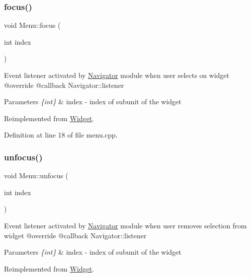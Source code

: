 \subsubsection{\texorpdfstring{focus()}{focus()}}
{\footnotesize\ttfamily void Menu\+::focus (\begin{DoxyParamCaption}\item[{int}]{index }\end{DoxyParamCaption})\hspace{0.3cm}{\ttfamily [virtual]}}

Event listener activated by \mbox{\hyperlink{class_navigator}{Navigator}} module when user selects on widget @override @callback Navigator\+::listener 
\begin{DoxyParams}{Parameters}
{\em \{int\}} & index -\/ index of subunit of the widget \\
\hline
\end{DoxyParams}


Reimplemented from \mbox{\hyperlink{class_widget_ac395fbcfd90f5a33a4bb2ca1d83631ca}{Widget}}.



Definition at line 18 of file menu.\+cpp.

\mbox{\label{class_menu_acc8b2492f87ebc9219eaad0fe0ecaa5c}} 
\subsubsection{\texorpdfstring{unfocus()}{unfocus()}}
{\footnotesize\ttfamily void Menu\+::unfocus (\begin{DoxyParamCaption}\item[{int}]{index }\end{DoxyParamCaption})\hspace{0.3cm}{\ttfamily [virtual]}}

Event listener activated by \mbox{\hyperlink{class_navigator}{Navigator}} module when user removes selection from widget @override @callback Navigator\+::listener 
\begin{DoxyParams}{Parameters}
{\em \{int\}} & index -\/ index of subunit of the widget \\
\hline
\end{DoxyParams}


Reimplemented from \mbox{\hyperlink{class_widget_a65f349812facca8302957a83b161a840}{Widget}}.



